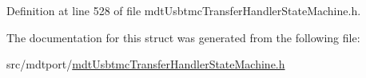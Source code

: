 Definition at line 528 of file mdt\-Usbtmc\-Transfer\-Handler\-State\-Machine.\-h.



The documentation for this struct was generated from the following file\-:\begin{DoxyCompactItemize}
\item 
src/mdtport/\hyperlink{mdt_usbtmc_transfer_handler_state_machine_8h}{mdt\-Usbtmc\-Transfer\-Handler\-State\-Machine.\-h}\end{DoxyCompactItemize}
